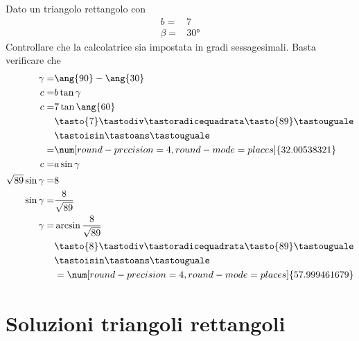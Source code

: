 \begin{exercise}
	Dato un triangolo rettangolo con
	\begin{align*}
	b=&7\\
	\beta=&\ang{30}
	\end{align*}
	\tcblower
	Controllare che la calcolatrice sia impostata in gradi sessagesimali.
	Basta verificare che \testgradi 
	\begin{align*}
	\gamma=&\ang{90}-\ang{30}\\
	c=&b\tan\gamma\\
	c=&7\tan\ang{60}\\
	&\tasto{7}\tastodiv\tastoradicequadrata\tasto{89}\tastouguale\\
	&\tastoisin\tastoans\tastouguale\\
	=&\num[round-precision=\lungarrotandamento,round-mode=places]{32.00538321}\\
	c=&a\sin\gamma\\
	\sqrt{89}\sin\gamma=&8\\
	\sin\gamma=&\frac{8}{\sqrt{89}}\\
	\gamma=&\arcsin\frac{8}{\sqrt{89}}\\
	&\tasto{8}\tastodiv\tastoradicequadrata\tasto{89}\tastouguale\\
	&\tastoisin\tastoans\tastouguale\\
	&=\num[round-precision=\lungarrotandamento,round-mode=places]{57.999461679}\\
	\end{align*}
\end{exercise}
\tcbstoprecording
 \newpage
 \section{Soluzioni triangoli rettangoli}
 \tcbinputrecords